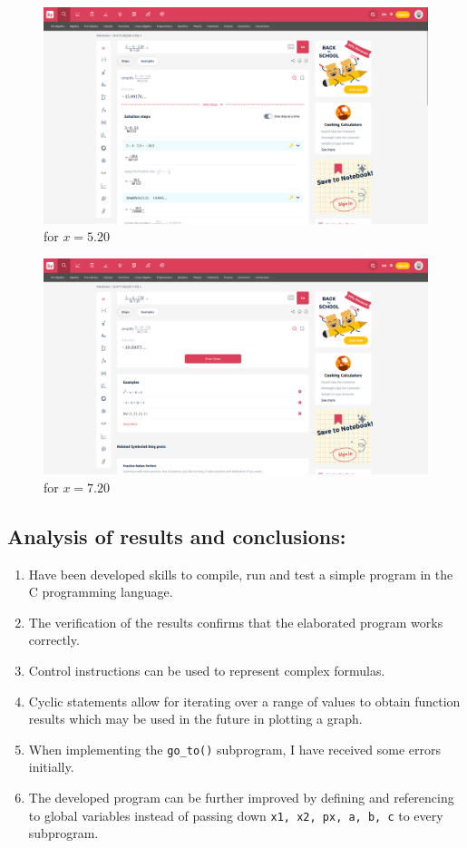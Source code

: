 \documentclass[a4paper, 11p]{article}
\begin{document}
\begin{figure}[!h]
  \centering
  \includegraphics[width=6in]{verif_2.png}
  \caption{for \( x = 5.20 \)}
\end{figure}

\begin{figure}[!h]
  \centering
  \includegraphics[width=6in]{verif_3.png}
  \caption{for \( x = 7.20 \)}
\end{figure}

\pagebreak

\subsection{Analysis of results and conclusions: }
\begin{enumerate}
 
    \item Have been developed skills to compile, run and test a simple program in the C programming language. 
    \item The verification of the results confirms that the elaborated program works correctly. 
    \item Control instructions can be used to represent complex formulas.
    \item Cyclic statements allow for iterating over a range of values to obtain function results which may be used in the future in plotting a graph.
    \item When implementing the \texttt{go\_to()} subprogram, I have received some errors initially.
    \item The developed program can be further improved by defining and referencing to global variables instead of passing down \texttt{x1, x2, px, a, b, c} to every subprogram.
    
\end{enumerate}

\printbibliography
\end{document}
